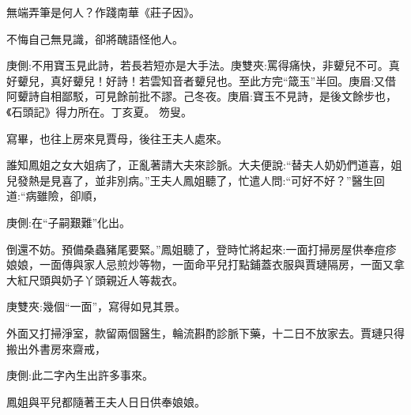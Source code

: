 \begin{poem}
    \begin{pl}無端弄筆是何人？作踐南華《莊子因》。\end{pl}

    \begin{pl}不悔自己無見識，卻將醜語怪他人。\end{pl}
    \begin{note}庚側:不用寶玉見此詩，若長若短亦是大手法。庚雙夾:罵得痛快，非顰兒不可。真好顰兒，真好顰兒！好詩！若雲知音者顰兒也。至此方完“箴玉”半回。庚眉:又借阿顰詩自相鄙駁，可見餘前批不謬。己冬夜。庚眉:寶玉不見詩，是後文餘步也，《石頭記》得力所在。丁亥夏。 笏叟。\end{note}
\end{poem}


\begin{parag}
    寫畢，也往上房來見賈母，後往王夫人處來。
\end{parag}


\begin{parag}
    誰知鳳姐之女大姐病了，正亂著請大夫來診脈。大夫便說:“替夫人奶奶們道喜，姐兒發熱是見喜了，並非別病。”王夫人鳳姐聽了，忙遣人問:“可好不好？”醫生回道:“病雖險，卻順，\begin{note}庚側:在“子嗣艱難”化出。\end{note}倒還不妨。預備桑蟲豬尾要緊。”鳳姐聽了，登時忙將起來:一面打掃房屋供奉痘疹娘娘，一面傳與家人忌煎炒等物，一面命平兒打點鋪蓋衣服與賈璉隔房，一面又拿大紅尺頭與奶子丫頭親近人等裁衣。\begin{note}庚雙夾:幾個“一面”，寫得如見其景。\end{note}外面又打掃淨室，款留兩個醫生，輪流斟酌診脈下藥，十二日不放家去。賈璉只得搬出外書房來齋戒，\begin{note}庚側:此二字內生出許多事來。\end{note}鳳姐與平兒都隨著王夫人日日供奉娘娘。
\end{parag}


